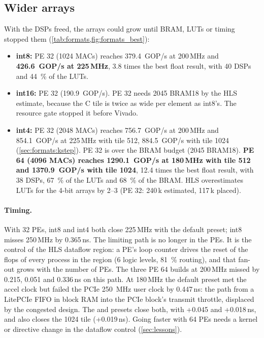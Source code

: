 \subsection{Wider arrays}
\label{sec:formats:wide}
With the DSPs freed, the arrays could grow until BRAM, LUTs or timing stopped them (\cref{tab:formats,fig:formats_best}):
\begin{itemize}
  \item \textbf{int8:} PE 32 (1024 MACs) reaches \SI{379.4}{GOP/s} at 200\,MHz and \textbf{\SI{426.6}{GOP/s} at
        225\,MHz}, 3.8 times the best float result, with 40 DSPs and \SI{44}{\percent} of the LUTs.
  \item \textbf{int16:} PE 32 (\SI{190.9}{GOP/s}). PE 32 needs 2045 BRAM18 by the HLS estimate, because the
        C tile is twice as wide per element as int8's. The resource gate stopped it before Vivado.
  \item \textbf{int4:} PE 32 (2048 MACs) reaches \SI{756.7}{GOP/s} at 200\,MHz and \SI{854.1}{GOP/s} at 225\,MHz
        with tile 512, \SI{884.5}{GOP/s} with tile 1024 (\cref{sec:formats:kstep}). PE 32 is over
        the BRAM budget (2045 BRAM18). \textbf{PE 64 (4096 MACs) reaches \SI{1290.1}{GOP/s} at 180\,MHz with
        tile 512 and \SI{1370.9}{GOP/s} with tile 1024}, 12.4 times the best float result, with 38 DSPs,
        \SI{67}{\percent} of the LUTs and \SI{68}{\percent} of the BRAM. HLS overestimates LUTs for the 4-bit arrays by 2--3\x{} (PE 32: 240\,k
        estimated, 117\,k placed).
\end{itemize}

\paragraph{Timing.} With 32 PEs, int8 and int4 both close 225\,MHz with the default preset; int8 misses 250\,MHz
by 0.365\,ns. The limiting path is no longer in the PEs. It is the control of the HLS dataflow region:
a PE's loop counter drives the reset of the  flops of every process in the region
(6 logic levels, \SI{81}{\percent} routing), and that fan-out grows with the number of PEs. The three PE 64
builds at 200\,MHz missed by 0.215, 0.051 and 0.336\,ns on this path. At 180\,MHz the default preset met the accel
clock but failed the PCIe \SI{250}{MHz} user clock by 0.447\,ns: the path from a LitePCIe FIFO in block RAM into the
PCIe block's transmit throttle, displaced by the congested design. The  and  presets
close both, with +0.045 and +0.018\,ns, and  also closes the 1024 tile
(+0.019\,ns). Going faster with 64 PEs needs a kernel or directive change in the
dataflow control (\cref{sec:lessons}).

